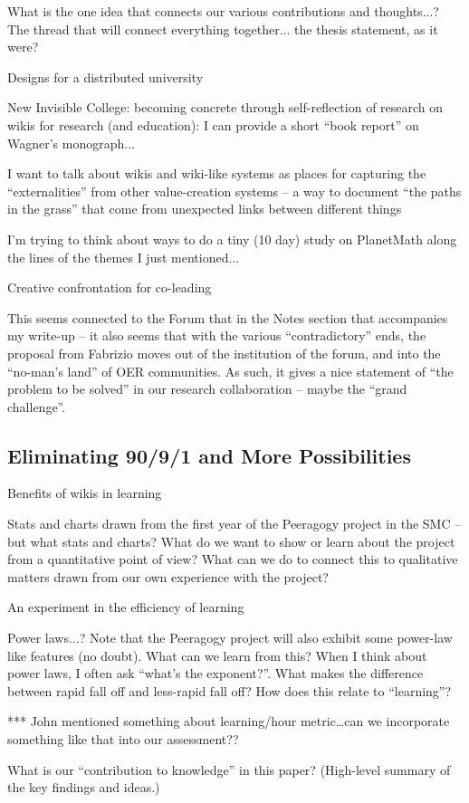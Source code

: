 \begin{cframed}[scarlet]
        What is the one idea that connects our various contributions and thoughts...? The thread that will connect everything together... the thesis statement, as it were?

    Designs for a distributed university

        New Invisible College: becoming concrete through self-reflection of research on wikis for research (and education): I can provide a short ``book report'' on Wagner's monograph...

        I want to talk about wikis and wiki-like systems as places for capturing the ``externalities'' from other value-creation systems -- a way to document ``the paths in the grass'' that come from unexpected links between different things

        I'm trying to think about ways to do a tiny (10 day) study on PlanetMath along the lines of the themes I just mentioned...

    Creative confrontation for co-leading

        This seems connected to the Forum that in the Notes section that accompanies my write-up -- it also seems that with the various ``contradictory'' ends, the proposal from Fabrizio moves out of the institution of the forum, and into the ``no-man's land'' of OER communities. As such, it gives a nice statement of ``the problem to be solved'' in our research collaboration -- maybe the ``grand challenge''.

\subsection{Eliminating 90/9/1 and More Possibilities}

    Benefits of wikis in learning

        Stats and charts drawn from the first year of the Peeragogy project in the SMC -- but what stats and charts? What do we want to show or learn about the project from a quantitative point of view? What can we do to connect this to qualitative matters drawn from our own experience with the project?

    An experiment in the efficiency of learning

        Power laws...? Note that the Peeragogy project will also exhibit some power-law like features (no doubt). What can we learn from this? When I think about power laws, I often ask ``what's the exponent?''. What makes the difference between rapid fall off and less-rapid fall off? How does this relate to ``learning''?

*** John mentioned something about learning/hour metric\ldots can we incorporate something like that into our assessment??

        What is our ``contribution to knowledge'' in this paper? (High-level summary of the key findings and ideas.)
\end{cframed}
